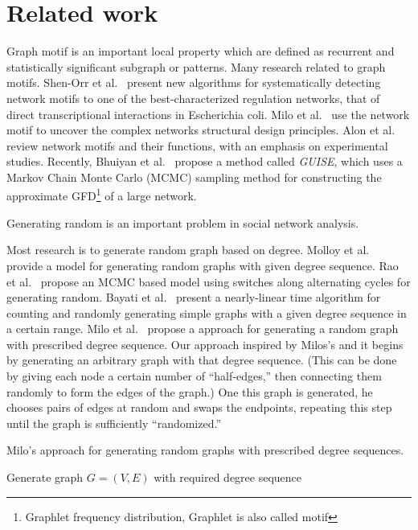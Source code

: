 \section{Related work}
\label{sec:related}

 Graph motif is an important local property which are defined as recurrent and statistically significant subgraph or patterns. Many research related to graph motifs. 
Shen-Orr et al.~\cite{shen2002network} present new algorithms for systematically detecting network motifs to one of the best-characterized regulation networks, that of direct transcriptional interactions in Escherichia coli. 
Milo et al.~\cite{milo2002network} use the network motif to uncover the complex networks structural design principles.
Alon et al.~\cite{alon2007network} review network motifs and their functions, with an emphasis on experimental studies.
Recently, Bhuiyan et al.~\cite{bhuiyan2012guise} propose a method called \textit{GUISE}, which uses a Markov Chain Monte Carlo (MCMC) sampling method for constructing the approximate GFD\footnote{Graphlet frequency distribution, Graphlet is also called motif} of a large network.

 Generating random is an important problem in social network analysis. 

Most research is to generate random graph based on degree. 
Molloy et al.~\cite{molloy1995critical} provide a model for generating random graphs with given degree sequence. 
Rao et al.~\cite{rao1996markov} propose an MCMC based model using switches along alternating cycles for generating random. 
Bayati et al.~\cite{bayati2010sequential} present a nearly-linear time algorithm for counting and randomly generating simple graphs with a given degree sequence in a certain range. 
Milo et al.~\cite{milo04random} propose a approach for generating a random graph with prescribed degree sequence. Our approach inspired by Milos's and it begins by generating an arbitrary graph with that degree sequence.  (This can be done by giving each node a certain number of ``half-edges,'' then connecting them randomly to form the edges of the graph.)  One this graph is generated, he chooses pairs of edges at random and swaps the endpoints, repeating this step until the graph is sufficiently ``randomized.''

\begin{algorithm}
\caption{Milo's approach for generating random graphs with prescribed degree sequences.}
\label{algorithm:milo}
\begin{algorithmic}
Generate graph $G = (V, E)$ with required degree sequence\\
\end{algorithmic}
\end{algorithm}

